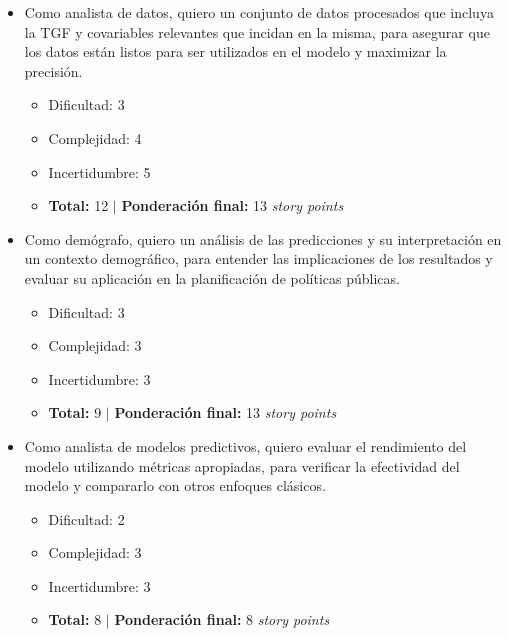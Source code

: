\documentclass[
11pt, %
]{charter}
\begin{document}
\begin{itemize}
	\item Como analista de datos, quiero un conjunto de datos procesados que incluya la TGF y covariables relevantes que incidan en la misma, para asegurar que los datos están listos para ser utilizados en el modelo y maximizar la precisión.
	\begin{itemize}
		\item Dificultad: 	3
		\item Complejidad: 	4
		\item Incertidumbre: 5
		\item \textbf{Total:} 12 $|$ \textbf{Ponderación final:} 13 \textit{story points}
	\end{itemize}
\end{itemize}

\begin{itemize}
	\item Como demógrafo, quiero un análisis de las predicciones y su interpretación en un contexto demográfico, para entender las implicaciones de los resultados y evaluar su aplicación en la planificación de políticas públicas.
	\begin{itemize}
		\item Dificultad: 	3
		\item Complejidad: 	3
		\item Incertidumbre: 3
		\item \textbf{Total:} 9 $|$ \textbf{Ponderación final:} 13 \textit{story points}
	\end{itemize}
\end{itemize}

\begin{itemize}
	\item Como analista de modelos predictivos, quiero evaluar el rendimiento del modelo utilizando métricas apropiadas, para verificar la efectividad del modelo y compararlo con otros enfoques clásicos.
	\begin{itemize}
		\item Dificultad: 	2
		\item Complejidad: 	3
		\item Incertidumbre: 3
		\item \textbf{Total:} 8 $|$ \textbf{Ponderación final:} 8 \textit{story points}
	\end{itemize}
\end{itemize}
\end{document}
